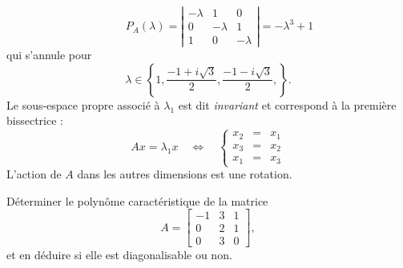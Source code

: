 \begin{enumerate}
$$ \qquad 
 P_A(\lambda) 
 = \left|\begin{array}{rrr} -\lambda & 1 & 0 \\ 0 & -\lambda & 1 \\ 1 & 0 & -\lambda \end{array}\right|
 = -\lambda^3 + 1
 $$
 qui s'annule pour 
 $$
 \lambda \in \left\{1, \frac{-1+i\sqrt{3}}{2}, \frac{-1-i\sqrt{3}}{2}, \right\}.
 $$
 Le sous-espace propre associé à $\lambda_1$ est dit {\em invariant} et correspond à la première bissectrice : 
 $$
 A x = \lambda_1 x \quad \Leftrightarrow \quad 
 \left\{\begin{array}{rcl} x_2 & = & x_1 \\ x_3 & = & x_2 \\ x_1 & = & x_3 \end{array} \right.
 $$
 L'action de $A$ dans les autres dimensions est une rotation.
\end{enumerate}


\begin{exercise*}
  Déterminer le polynôme caractéristique de la matrice
  $$
  A = \left[\begin{array}{rrr}
  -1 & 3 & 1 \\ 0 & 2 & 1 \\ 0 & 3 & 0
  \end{array}\right], 
  $$
  et en déduire si elle est diagonalisable ou non.
\end{exercise*}

